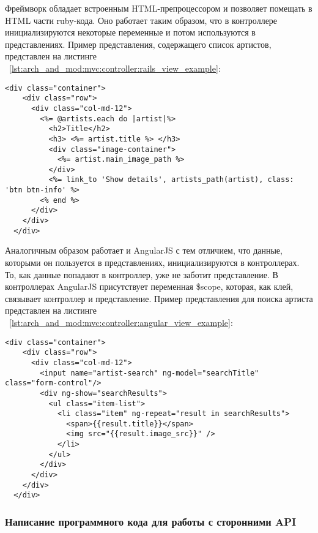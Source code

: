 
Фреймворк \ror{} обладает встроенным HTML-препроцессором и позволяет помещать в HTML части ruby-кода. Оно работает таким образом, что в контроллере инициализируются некоторые переменные и потом используются в представлениях. Пример представления, содержащего список артистов, представлен на листинге ~\ref{lst:arch_and_mod:mvc:controller:rails_view_example}:

\begin{lstlisting}[language=HTML5,caption={Пример получения артистов по определённым параметрам}, label=lst:arch_and_mod:mvc:controller:rails_view_example]
  <div class="container">
    <div class="row">
      <div class="col-md-12">
        <%= @artists.each do |artist|%>
          <h2>Title</h2>
          <h3> <%= artist.title %> </h3>
          <div class="image-container">
            <%= artist.main_image_path %>
          </div>
          <%= link_to 'Show details', artists_path(artist), class: 'btn btn-info' %>
        <% end %>
      </div>
    </div>
  </div>
\end{lstlisting}

Аналогичным образом работает и AngularJS с тем отличием, что данные, которыми он пользуется в представлениях, инициализируются в контроллерах. То, как данные попадают в контроллер, уже не заботит представление. В контроллерах AngularJS присутствует переменная \$scope, которая, как клей, связывает контроллер и представление. Пример представления для поиска артиста представлен на листинге ~\ref{lst:arch_and_mod:mvc:controller:angular_view_example}:

\begin{lstlisting}[language=HTML5,caption={Пример получения артистов по определённым параметрам}, label=lst:arch_and_mod:mvc:controller:angular_view_example]
  <div class="container">
    <div class="row">
      <div class="col-md-12">
        <input name="artist-search" ng-model="searchTitle" class="form-control"/>
        <div ng-show="searchResults">
          <ul class="item-list">
            <li class="item" ng-repeat="result in searchResults">
              <span>{{result.title}}</span>
              <img src="{{result.image_src}}" />
            </li>
          </ul>
        </div>
      </div>
    </div>
  </div>
\end{lstlisting}


\subsubsection{Написание программного кода для работы с сторонними API}
\label{sub:arch_and_mod:mvc:controller}
~\\

